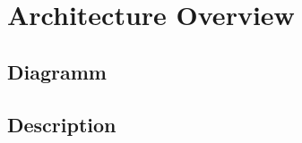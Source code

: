 \documentclass[main.tex]{subfiles}
\begin{document}
	\begingroup

	\renewcommand{\cleardoublepage}{}

	\renewcommand{\clearpage}{}

	\chapter{Architecture Overview}

		\chapterauthor{}
		
		\section{Diagramm}
		
		\section{Description}
	  	

	\endgroup
\end{document}
